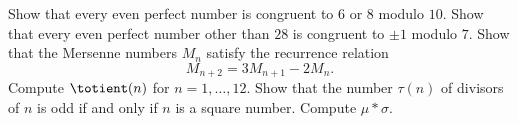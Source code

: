 \exercises

\begin{starter}
  \exercise Show that every even perfect number is congruent to $6$ or $8$ modulo $10$.
  \exercise Show that every even perfect number other than $28$ is congruent to $\pm 1$ modulo $7$.
  \exercise \label{exercise:mersenne-lucas-sequence}Show that the Mersenne numbers $M_n$ satisfy the recurrence relation
  \begin{equation*}
    M_{n+2}=3M_{n+1}-2M_n.
  \end{equation*}
  \exercise Compute $\totient(n)$ for $n=1,\ldots,12$.
  \exercise Show that the number $\tau(n)$ of divisors of $n$ is odd if and only if $n$ is a square number.
  \exercise Compute $\mu\ast\sigma$. %
\end{starter}

